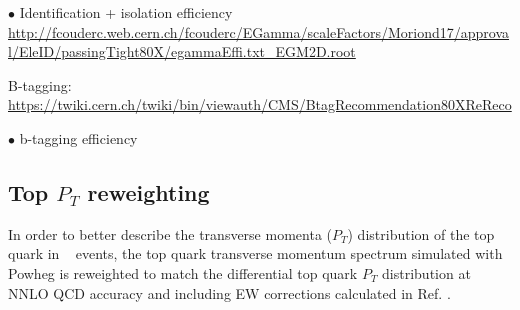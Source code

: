 $\bullet$ Identification + isolation efficiency
{\small\url{http://fcouderc.web.cern.ch/fcouderc/EGamma/scaleFactors/Moriond17/approval/EleID/passingTight80X/egammaEffi.txt\_EGM2D.root}}
\medskip

B-tagging: {\small\url{https://twiki.cern.ch/twiki/bin/viewauth/CMS/BtagRecommendation80XReReco}}

$\bullet$ b-tagging efficiency

\subsection{Top $P_{T}$ reweighting}
In order to better describe the transverse momenta ($P_{T}$) distribution of the top quark in \ttbar~ events, the top quark transverse momentum spectrum simulated with {\sc Powheg}  is reweighted to match the differential top quark ${P}_{T}$ distribution at NNLO QCD accuracy and including EW corrections calculated in Ref. \cite{Czakon:2017wor}.
